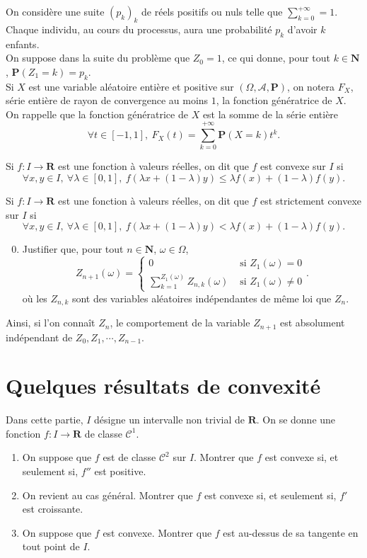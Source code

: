 \documentclass[a4paper,11pt]{article}
\newcommand{\N}{\mathbf{N}}
\newcommand{\R}{\mathbf{R}}
\renewcommand{\P}{\mathbf{P}}
\newcommand{\suite}[2]{{\left({#1}_{#2}\right)}_{#2}}
\begin{document}
On considère une suite $\suite{p}{k}$ de réels positifs ou nuls telle que $\displaystyle\sum_{k=0}^{+\infty}=1$. Chaque individu, au cours du processus, aura une probabilité $p_k$
d’avoir $k$ enfants.\\

On suppose dans la suite du problème que $Z_0=1$, ce qui donne, pour tout $k\in\N$, $\P(Z_1=k)=p_k$.\\

Si $X$ est une variable aléatoire entière et positive sur $(\Omega,\mathcal{A},\P)$, on notera $F_X$, série entière de rayon de
convergence au moins $1$, la fonction génératrice de $X$. On rappelle que la fonction génératrice de $X$ est la
somme de la série entière
\[\forall t\in[-1,1],\ F_X(t)=\displaystyle\sum_{k=0}^{+\infty}\P(X=k)t^k.\]

Si $f:I\rightarrow\R$ est une fonction à valeurs réelles, on dit que $f$ est convexe sur $I$ si
\[\forall x,y\in I,\ \forall\lambda\in[0,1],\ f(\lambda x+(1-\lambda)y)\leq\lambda f(x)+(1-\lambda)f(y).\]

Si $f:I\rightarrow\R$ est une fonction à valeurs réelles, on dit que $f$ est strictement convexe sur $I$ si
\[\forall x,y\in I,\ \forall\lambda\in[0,1],\ f(\lambda x+(1-\lambda)y)<\lambda f(x)+(1-\lambda)f(y).\]

\begin{enumerate}
\setcounter{enumi}{-1}
\item Justifier que, pour tout $n\in\N$, $\omega\in\Omega$,
\[Z_{n+1}(\omega)=\begin{cases}
	0&\text{ si }Z_1(\omega)=0\\
	\displaystyle\sum_{k=1}^{Z_1(\omega)}Z_{n,k}(\omega)&\text{ si }Z_1(\omega)\neq 0
\end{cases}.\]
où les $Z_{n,k}$ sont des variables aléatoires indépendantes de même loi que $Z_n$.
\end{enumerate}
Ainsi, si l'on connaît $Z_n$, le comportement de la variable $Z_{n+1}$ est absolument indépendant de $Z_0,Z_1,\cdots,Z_{n-1}$.\\

\section{Quelques résultats de convexité}
Dans cette partie, $I$ désigne un intervalle non trivial de $\R$. On se donne une fonction $f:I\rightarrow\R$ de classe $\mathcal{C}^1$.

\begin{enumerate}
\item On suppose que $f$ est de classe $\mathcal{C}^2$ sur $I$. Montrer que $f$ est convexe si, et seulement si, $f''$ est positive.
\item On revient au cas général. Montrer que $f$ est convexe si, et seulement si, $f'$ est croissante.
\item On suppose que $f$ est convexe. Montrer que $f$ est au-dessus de sa tangente en tout point de $I$.
\end{enumerate}
\end{document}
